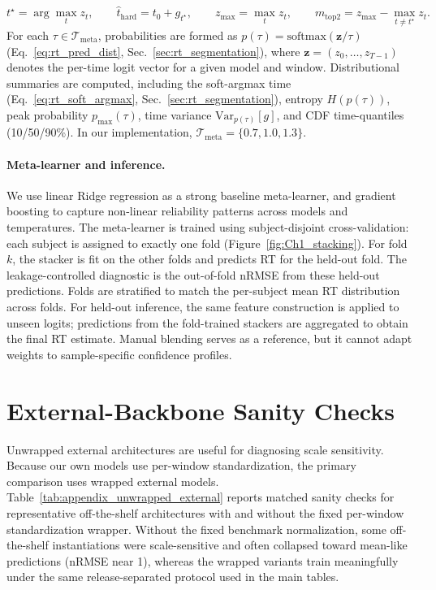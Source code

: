 \documentclass[12pt]{article}
\begin{document}
\begin{equation}
\label{eq:rt_stacking_logit_features}
t^\star = \arg\max_{t} z_t,\qquad
\hat t_{\mathrm{hard}} = t_0 + g_{t^\star},\qquad
z_{\max} = \max_t z_t,\qquad
m_{\mathrm{top2}} = z_{\max} - \max_{t\neq t^\star} z_t.
\end{equation}
For each $\tau\in\mathcal{T}_{\text{meta}}$, probabilities are formed as $p(\tau)=\mathrm{softmax}(\mathbf{z}/\tau)$ (Eq.~\ref{eq:rt_pred_dist}, Sec.~\ref{sec:rt_segmentation}), where $\mathbf{z}=(z_0,\dots,z_{T-1})$ denotes the per-time logit vector for a given model and window. Distributional summaries
are computed, including the soft-argmax time (Eq.~\ref{eq:rt_soft_argmax}, Sec.~\ref{sec:rt_segmentation}), entropy $H(p(\tau))$, peak probability
$p_{\max}(\tau)$, time variance $\mathrm{Var}_{p(\tau)}[g]$, and CDF time-quantiles (10/50/90\%). In our implementation,
$\mathcal{T}_{\text{meta}}=\{0.7,1.0,1.3\}$.

\paragraph{Meta-learner and inference.}
We use linear Ridge regression as a strong baseline meta-learner, and gradient boosting to capture non-linear reliability
patterns across models and temperatures. The meta-learner is trained using subject-disjoint cross-validation: each subject is assigned to exactly one fold (Figure~\ref{fig:Ch1_stacking}). For fold $k$, the stacker is fit on the other folds and predicts RT for the held-out fold. The leakage-controlled diagnostic is the out-of-fold nRMSE from these held-out predictions. Folds are stratified to match the per-subject mean RT distribution across folds. For held-out inference, the same feature construction is applied to unseen logits; predictions from the fold-trained stackers are aggregated to obtain the final RT estimate.
Manual blending serves as a reference, but it cannot adapt weights to sample-specific confidence profiles.

\section{External-Backbone Sanity Checks}

Unwrapped external architectures are useful for diagnosing scale sensitivity. Because our own models use per-window standardization, the primary comparison uses wrapped external models. Table~\ref{tab:appendix_unwrapped_external} reports matched sanity checks for representative off-the-shelf architectures with and without the fixed per-window standardization wrapper. Without the fixed benchmark normalization, some off-the-shelf instantiations were scale-sensitive and often collapsed toward mean-like predictions (nRMSE near 1), whereas the wrapped variants train meaningfully under the same release-separated protocol used in the main tables.
\end{document}
